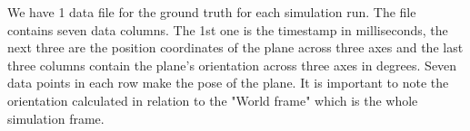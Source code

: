 We have 1 data file for the ground truth for each simulation run. The file contains seven data columns. The 1st one is the timestamp in milliseconds, the next three are the position coordinates of the plane across three axes and the last three columns contain the plane’s orientation across three axes in degrees. Seven data points in each row make the pose of the plane. It is important to note the orientation calculated in relation to the "World frame" which is the whole simulation frame. 

